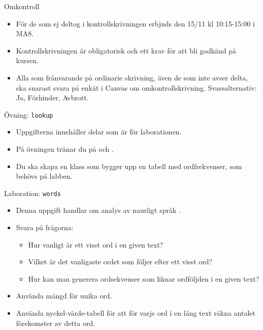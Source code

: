 

\ifkompendium\else
\begin{Slide}{Omkontroll}
\begin{itemize}
\item För de som ej deltog i kontrollskrivningen erbjuds  den 15/11 kl 10:15-15:00 i MA8. 
\item Kontrollskrivningen är obligatorisk och ett krav för att bli godkänd på kursen.
\item Alla som frånvarande på ordinarie skrivning, även de som inte avser delta, ska snarast svara på enkät i Canvas om omkontrollskrivning. Svarsalternativ: Ja, Förhinder, Avbrott.
\end{itemize}  
\end{Slide}
\fi


\begin{Slide}{Övning: \texttt{lookup}}
\begin{itemize}
  \item Uppgifterna innehåller delar som är  för laborationen.
  \item På övningen tränar du på  och .
  \item Du ska skapa en klass  som bygger upp en tabell med ordfrekvenser, som behövs på labben.
\end{itemize}
\end{Slide}

\begin{Slide}{Laboration: \texttt{words}}
\begin{itemize}
  \item Denna uppgift handlar om analys av naurligt språk .
  \item Svara på frågorna:
  \begin{itemize}%
  \item Hur vanligt är ett visst ord i en given text?
  \item Vilket är det vanligaste ordet som följer efter ett visst ord?
  \item Hur kan man generera ordsekvenser som liknar ordföljden i en given text?
  \end{itemize}
\item Använda mängd för unika ord.
\item Använda nyckel-värde-tabell för att för varje ord i en lång text räkna antalet förekomster av detta ord.
\end{itemize}
\end{Slide}


